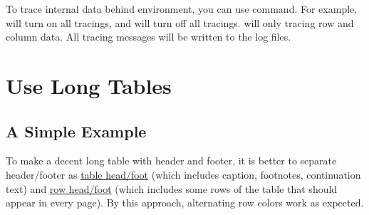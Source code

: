 \documentclass[oneside]{book}
\begin{document}
To trace internal data behind  environment, you can use \CC{\SetTblrTracing} command.
For example,  will turn on all tracings,
and  will turn off all tracings.
 will only tracing row and column data.
All tracing messages will be written to the log files.

\chapter{Use Long Tables}
\label{chap:long}

\section{A Simple Example}

To make a decent long table with header and footer, it is better to separate header/footer as
\underline{table head/foot} (which includes caption, footnotes, continuation text)
and \underline{row head/foot} (which includes some rows of the table that should appear in every page).
By this approach, alternating row colors work as expected.
\end{document}
